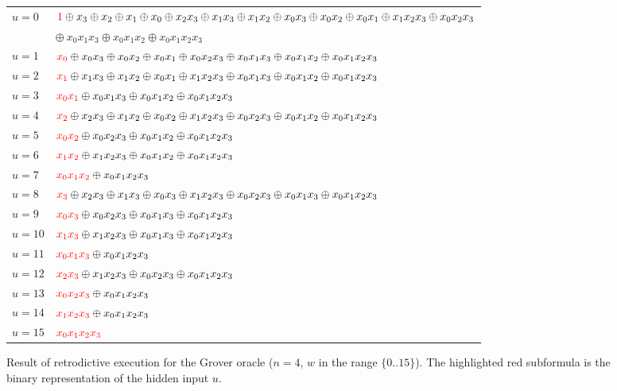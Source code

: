 \documentclass[sigplan]{acmart}
\newcommand{\red}[1]{{\color{red}{#1}}}
\begin{document}
\begin{figure}
\begin{tabular}{ll}
$u=0$ & 
  $\red{1} \oplus x_3 \oplus x_2 \oplus x_1 \oplus x_0 \oplus x_2x_3 \oplus x_1x_3 \oplus x_1x_2 \oplus x_0x_3 \oplus x_0x_2 \oplus x_0x_1 \oplus x_1x_2x_3 \oplus x_0x_2x_3$ \\
   &\quad $\oplus ~x_0x_1x_3 \oplus x_0x_1x_2 \oplus x_0x_1x_2x_3$ \\
$u=1$ & 
  $\red{x_0} \oplus x_0x_3 \oplus x_0x_2 \oplus x_0x_1 \oplus x_0x_2x_3 \oplus x_0x_1x_3 \oplus x_0x_1x_2 \oplus x_0x_1x_2x_3$ \\
$u=2$ &
  $\red{x_1} \oplus x_1x_3 \oplus x_1x_2 \oplus x_0x_1 \oplus x_1x_2x_3 \oplus x_0x_1x_3 \oplus x_0x_1x_2 \oplus x_0x_1x_2x_3$ \\
$u=3$ &
  $\red{x_0x_1} \oplus x_0x_1x_3 \oplus x_0x_1x_2 \oplus x_0x_1x_2x_3$ \\
$u=4$ &
  $\red{x_2} \oplus x_2x_3 \oplus x_1x_2 \oplus x_0x_2 \oplus x_1x_2x_3 \oplus x_0x_2x_3 \oplus x_0x_1x_2 \oplus x_0x_1x_2x_3$ \\
$u=5$ &
  $\red{x_0x_2} \oplus x_0x_2x_3 \oplus x_0x_1x_2 \oplus x_0x_1x_2x_3$ \\
$u=6$ &
  $\red{x_1x_2} \oplus x_1x_2x_3 \oplus x_0x_1x_2 \oplus x_0x_1x_2x_3$ \\
$u=7$ &
  $\red{x_0x_1x_2} \oplus x_0x_1x_2x_3$ \\
$u=8$ &
  $\red{x_3} \oplus x_2x_3 \oplus x_1x_3 \oplus x_0x_3 \oplus x_1x_2x_3 \oplus x_0x_2x_3 \oplus x_0x_1x_3 \oplus x_0x_1x_2x_3$ \\
$u=9$ &
  $\red{x_0x_3} \oplus x_0x_2x_3 \oplus x_0x_1x_3 \oplus x_0x_1x_2x_3$ \\
$u=10$ &
  $\red{x_1x_3} \oplus x_1x_2x_3 \oplus x_0x_1x_3 \oplus x_0x_1x_2x_3$ \\
$u=11$ &
  $\red{x_0x_1x_3} \oplus x_0x_1x_2x_3$ \\
$u=12$ &
  $\red{x_2x_3} \oplus x_1x_2x_3 \oplus x_0x_2x_3 \oplus x_0x_1x_2x_3$ \\
$u=13$ &
  $\red{x_0x_2x_3} \oplus x_0x_1x_2x_3$ \\
$u=14$ &
  $\red{x_1x_2x_3} \oplus x_0x_1x_2x_3$ \\
$u=15$ &
  $\red{x_0x_1x_2x_3}$
\end{tabular}
\caption{\label{fig:Grover}Result of retrodictive execution for the Grover oracle ($n=4$, $w$ in the range $\{0..15\}$). The highlighted red subformula is the binary representation of the hidden input $u$.}
\end{figure}
\end{document}
